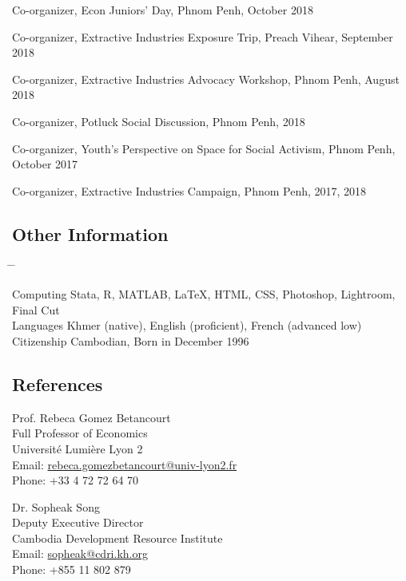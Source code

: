 \documentclass[10pt,a4paper]{article}
\newcommand{\tabbedblock}[1]{

	\begin{tabbing}
		\hspace{2cm} \= \hspace{4cm} \= \kill
		#1
	\end{tabbing}
}
\begin{document}
Co-organizer, Econ Juniors' Day, Phnom Penh, October 2018

Co-organizer, Extractive Industries Exposure Trip, Preach Vihear, September 2018

Co-organizer, Extractive Industries Advocacy Workshop, Phnom Penh, August 2018

Co-organizer, Potluck Social Discussion, Phnom Penh, 2018

Co-organizer, Youth's Perspective on Space for Social Activism, Phnom Penh, October 2017

Co-organizer, Extractive Industries Campaign, Phnom Penh, 2017, 2018



\subsection*{Other Information}

\tabbedblock{
	Computing \> Stata, R, MATLAB, \LaTeX, HTML, CSS, Photoshop, Lightroom, Final Cut\\
	
	Languages \> Khmer (native), English (proficient), French (advanced low)\\
	
	Citizenship \> Cambodian, Born in December 1996
}


\subsection*{References}		

\parbox{0.5\textwidth}{ %
	Prof. Rebeca Gomez Betancourt\\ 
	Full Professor of Economics\\ 
	Université Lumière Lyon 2\\
	Email: \href{mailto: Phone: rebeca.gomezbetancourt@univ-lyon2.fr}{rebeca.gomezbetancourt@univ-lyon2.fr}\\
	Phone: +33 4 72 72 64 70
}
\hfill %
\parbox{0.5\textwidth}{ %
	Dr. Sopheak Song\\ 
	Deputy Executive Director \\
	Cambodia Development Resource Institute\\ 
	Email: \href{mailto: sopheak@cdri.kh.org}{sopheak@cdri.kh.org}\\
	Phone: +855 11 802 879
}
\end{document}
